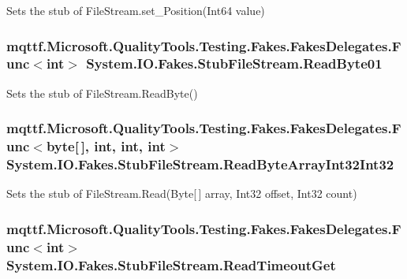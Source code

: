 Sets the stub of File\-Stream.\-set\-\_\-\-Position(\-Int64 value)

\hypertarget{class_system_1_1_i_o_1_1_fakes_1_1_stub_file_stream_a6380aa2039aaf11cc1264224df5be6e3}{
\subsubsection[{Read\-Byte01}]{\setlength{\rightskip}{0pt plus 5cm}mqttf.\-Microsoft.\-Quality\-Tools.\-Testing.\-Fakes.\-Fakes\-Delegates.\-Func$<$int$>$ System.\-I\-O.\-Fakes.\-Stub\-File\-Stream.\-Read\-Byte01}}\label{class_system_1_1_i_o_1_1_fakes_1_1_stub_file_stream_a6380aa2039aaf11cc1264224df5be6e3}


Sets the stub of File\-Stream.\-Read\-Byte()

\hypertarget{class_system_1_1_i_o_1_1_fakes_1_1_stub_file_stream_adf07bebf02cb1234a9f0c2d454a69471}{
\subsubsection[{Read\-Byte\-Array\-Int32\-Int32}]{\setlength{\rightskip}{0pt plus 5cm}mqttf.\-Microsoft.\-Quality\-Tools.\-Testing.\-Fakes.\-Fakes\-Delegates.\-Func$<$byte\mbox{[}$\,$\mbox{]}, int, int, int$>$ System.\-I\-O.\-Fakes.\-Stub\-File\-Stream.\-Read\-Byte\-Array\-Int32\-Int32}}\label{class_system_1_1_i_o_1_1_fakes_1_1_stub_file_stream_adf07bebf02cb1234a9f0c2d454a69471}


Sets the stub of File\-Stream.\-Read(\-Byte\mbox{[}$\,$\mbox{]} array, Int32 offset, Int32 count)

\hypertarget{class_system_1_1_i_o_1_1_fakes_1_1_stub_file_stream_a5155a35f0105a12ecd38533e948de3d1}{
\subsubsection[{Read\-Timeout\-Get}]{\setlength{\rightskip}{0pt plus 5cm}mqttf.\-Microsoft.\-Quality\-Tools.\-Testing.\-Fakes.\-Fakes\-Delegates.\-Func$<$int$>$ System.\-I\-O.\-Fakes.\-Stub\-File\-Stream.\-Read\-Timeout\-Get}}\label{class_system_1_1_i_o_1_1_fakes_1_1_stub_file_stream_a5155a35f0105a12ecd38533e948de3d1}



